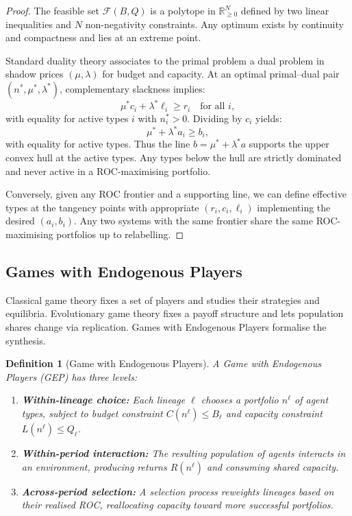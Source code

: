 \documentclass[12pt]{article}
\newtheorem{definition}[theorem]{Definition}
\newcommand{\R}{\mathbb{R}}
\begin{document}
\begin{proof}
The feasible set $\mathcal{F}(B, Q)$ is a polytope in $\R^N_{\geq 0}$ defined by two linear inequalities and $N$ non-negativity constraints. Any optimum exists by continuity and compactness and lies at an extreme point.

Standard duality theory associates to the primal problem a dual problem in shadow prices $(\mu, \lambda)$ for budget and capacity. At an optimal primal--dual pair $(n^*, \mu^*, \lambda^*)$, complementary slackness implies:
\[
\mu^* c_i + \lambda^* \ell_i \geq r_i \quad \text{for all } i,
\]
with equality for active types $i$ with $n^*_i > 0$. Dividing by $c_i$ yields:
\[
\mu^* + \lambda^* a_i \geq b_i,
\]
with equality for active types. Thus the line $b = \mu^* + \lambda^* a$ supports the upper convex hull at the active types. Any types below the hull are strictly dominated and never active in a ROC-maximising portfolio.

Conversely, given any ROC frontier and a supporting line, we can define effective types at the tangency points with appropriate $(r_i, c_i, \ell_i)$ implementing the desired $(a_i, b_i)$. Any two systems with the same frontier share the same ROC-maximising portfolios up to relabelling.
\end{proof}

\subsection{Games with Endogenous Players}

Classical game theory fixes a set of players and studies their strategies and equilibria. Evolutionary game theory fixes a payoff structure and lets population shares change via replication. Games with Endogenous Players formalise the synthesis.

\begin{definition}[Game with Endogenous Players]
A \emph{Game with Endogenous Players (GEP)} has three levels:
\begin{enumerate}
    \item \textbf{Within-lineage choice:} Each lineage $\ell$ chooses a portfolio $n^\ell$ of agent types, subject to budget constraint $C(n^\ell) \leq B_\ell$ and capacity constraint $L(n^\ell) \leq Q_\ell$.
    
    \item \textbf{Within-period interaction:} The resulting population of agents interacts in an environment, producing returns $R(n^\ell)$ and consuming shared capacity.
    
    \item \textbf{Across-period selection:} A selection process reweights lineages based on their realised ROC, reallocating capacity toward more successful portfolios.
\end{enumerate}
\end{definition}
\end{document}
